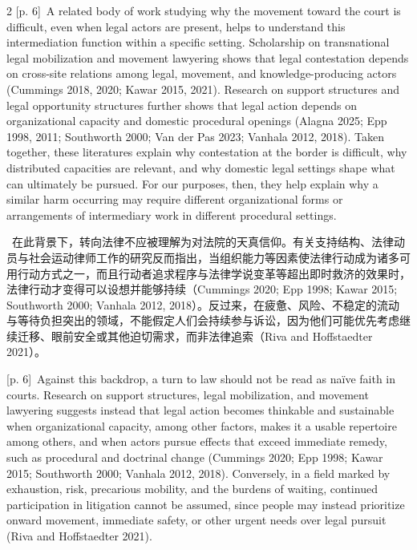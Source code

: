 \documentclass[10pt,a4paper]{article}
\begin{document}
\begin{paracol}{2}
\switchcolumn
{\scriptsize\color{gray} [p. 6]}\ A related body of work studying why the movement toward the court is difficult, even when legal actors are present, helps to understand this intermediation function within a specific setting. Scholarship on transnational legal mobilization and movement lawyering shows that legal contestation depends on cross-site relations among legal, movement, and knowledge-producing actors (Cummings 2018, 2020; Kawar 2015, 2021). Research on support structures and legal opportunity structures further shows that legal action depends on organizational capacity and domestic procedural openings (Alagna 2025; Epp 1998, 2011; Southworth 2000; Van der Pas 2023; Vanhala 2012, 2018). Taken together, these literatures explain why contestation at the border is difficult, why distributed capacities are relevant, and why domestic legal settings shape what can ultimately be pursued. For our purposes, then, they help explain why a similar harm occurring may require different organizational forms or arrangements of intermediary work in different procedural settings.\par
\switchcolumn*
{\scriptsize\color{gray} [p. 6]}\ 在此背景下，转向法律不应被理解为对法院的天真信仰。有关支持结构、法律动员与社会运动律师工作的研究反而指出，当组织能力等因素使法律行动成为诸多可用行动方式之一，而且行动者追求程序与法律学说变革等超出即时救济的效果时，法律行动才变得可以设想并能够持续（Cummings 2020; Epp 1998; Kawar 2015; Southworth 2000; Vanhala 2012, 2018）。反过来，在疲惫、风险、不稳定的流动与等待负担突出的领域，不能假定人们会持续参与诉讼，因为他们可能优先考虑继续迁移、眼前安全或其他迫切需求，而非法律追索（Riva and Hoffstaedter 2021）。\par
\switchcolumn
{\scriptsize\color{gray} [p. 6]}\ Against this backdrop, a turn to law should not be read as naïve faith in courts. Research on support structures, legal mobilization, and movement lawyering suggests instead that legal action becomes thinkable and sustainable when organizational capacity, among other factors, makes it a usable repertoire among others, and when actors pursue effects that exceed immediate remedy, such as procedural and doctrinal change (Cummings 2020; Epp 1998; Kawar 2015; Southworth 2000; Vanhala 2012, 2018). Conversely, in a field marked by exhaustion, risk, precarious mobility, and the burdens of waiting, continued participation in litigation cannot be assumed, since people may instead prioritize onward movement, immediate safety, or other urgent needs over legal pursuit (Riva and Hoffstaedter 2021).\par

\end{paracol}
\end{document}

